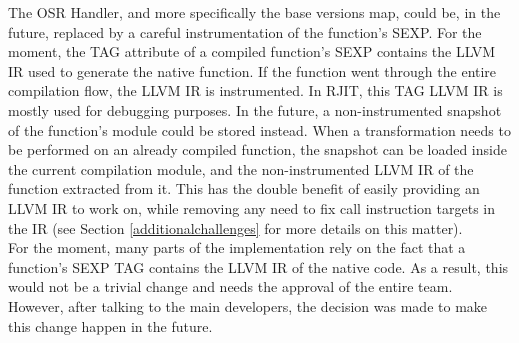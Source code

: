 The OSR Handler, and more specifically the base versions map, could be, in the future, replaced by a careful instrumentation of the function's SEXP. 
For the moment, the TAG attribute of a compiled function's SEXP contains the LLVM IR used to generate the native function.
If the function went through the entire compilation flow, the LLVM IR is instrumented. 
In RJIT, this TAG LLVM IR is mostly used for debugging purposes.
In the future, a non-instrumented snapshot of the function's module could be stored instead.
When a transformation needs to be performed on an already compiled function, the snapshot can be loaded inside the current compilation module, and the non-instrumented LLVM IR of the function extracted from it.
This has the double benefit of easily providing an LLVM IR to work on, while removing any need to fix call instruction targets in the IR (see Section \ref{additionalchallenges} for more details on this matter).\\

For the moment, many parts of the implementation rely on the fact that a function's SEXP TAG contains the LLVM IR of the native code. 
As a result, this would not be a trivial change and needs the approval of the entire team.
However, after talking to the main developers, the decision was made to make this change happen in the future.\\